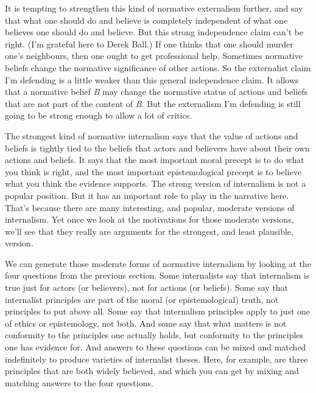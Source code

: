 It is tempting to strengthen this kind of normative externalism further, and say that what one should do and believe is completely independent of what one believes one should do and believe. But this strong independence claim can't be right. (I'm grateful here to Derek Ball.) If one thinks that one should murder one's neighbours, then one ought to get professional help. Sometimes normative beliefs change the normative significance of other actions. So the externalist claim I'm defending is a little weaker than this general independence claim. It allows that a normative belief \emph{B} may change the normative status of actions and beliefs that are not part of the content of \emph{B}. But the externalism I'm defending is still going to be strong enough to allow a lot of critics.

The strongest kind of normative internalism says that the value of actions and beliefs is tightly tied to the beliefs that actors and believers have about their own actions and beliefs. It says that the most important moral precept is to do what you think is right, and the most important epistemological precept is to believe what you think the evidence supports. The strong version of internalism is not a popular position. But it has an important role to play in the narrative here. That's because there are many interesting, and popular, moderate versions of internalism. Yet once we look at the motivations for those moderate versions, we'll see that they really are arguments for the strongest, and least plausible, version.

We can generate those moderate forms of normative internalism by looking at the four questions from the previous section. Some internalists say that internalism is true just for actors (or believers), not for actions (or beliefs). Some say that internalist principles are part of the moral (or epistemological) truth, not principles to put above all. Some say that internalism principles apply to just one of ethics or epistemology, not both. And some say that what matters is not conformity to the principles one actually holds, but conformity to the principles one has evidence for. And answers to these questions can be mixed and matched indefinitely to produce varieties of internalist theses. Here, for example, are three principles that are both widely believed, and which you can get by mixing and matching answers to the four questions.

